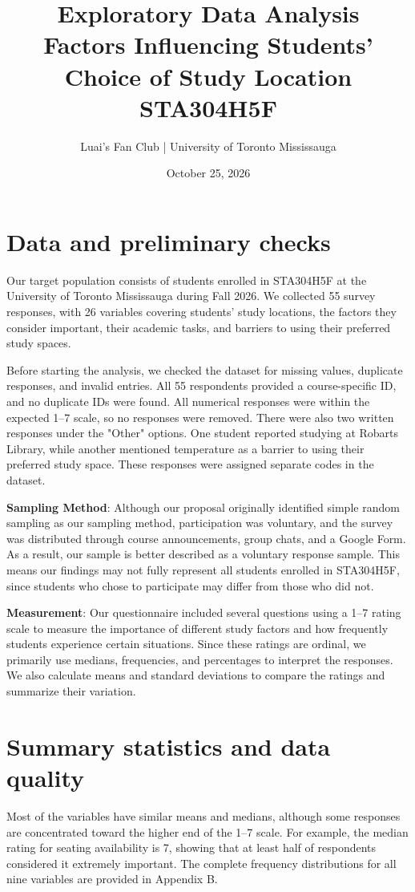 \documentclass[11pt,letterpaper]{article}
\title{\vspace{-2cm}\bfseries Exploratory Data Analysis\\\large Factors Influencing Students' Choice of Study Location\\\normalsize STA304H5F}
\author{Luai's Fan Club \quad | \quad University of Toronto Mississauga}
\date{October 25, 2026}
\begin{document}
\maketitle
\vspace{-1cm}

\section{Data and preliminary checks}
Our target population consists of students enrolled in STA304H5F at the University of Toronto Mississauga during Fall 2026. We collected 55 survey responses, with 26 variables covering students' study locations, the factors they consider important, their academic tasks, and barriers to using their preferred study spaces.

Before starting the analysis, we checked the dataset for missing values, duplicate responses, and invalid entries. All 55 respondents provided a course-specific ID, and no duplicate IDs were found. All numerical responses were within the expected 1–7 scale, so no responses were removed. There were also two written responses under the "Other" options. One student reported studying at Robarts Library, while another mentioned temperature as a barrier to using their preferred study space. These responses were assigned separate codes in the dataset.

\textbf{Sampling Method}: Although our proposal originally identified simple random sampling as our sampling method, participation was voluntary, and the survey was distributed through course announcements, group chats, and a Google Form. As a result, our sample is better described as a voluntary response sample. This means our findings may not fully represent all students enrolled in STA304H5F, since students who chose to participate may differ from those who did not.

\textbf{Measurement}: Our questionnaire included several questions using a 1–7 rating scale to measure the importance of different study factors and how frequently students experience certain situations. Since these ratings are ordinal, we primarily use medians, frequencies, and percentages to interpret the responses. We also calculate means and standard deviations to compare the ratings and summarize their variation.

\section{Summary statistics and data quality}
Most of the variables have similar means and medians, although some responses are concentrated toward the higher end of the 1–7 scale. For example, the median rating for seating availability is 7, showing that at least half of respondents considered it extremely important. The complete frequency distributions for all nine variables are provided in Appendix B.
\end{document}
